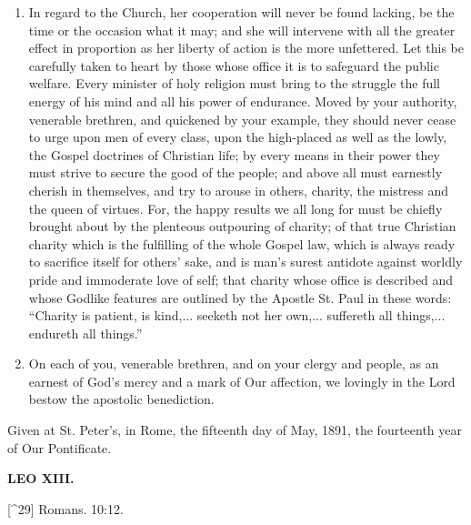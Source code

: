 \documentclass{book}
\begin{document}
\begin{enumerate}
	\item In regard to the Church, her cooperation will never be found lacking, be the time or the occasion what it may; and she will intervene with all the greater effect in proportion as her liberty of action is the more unfettered. Let this be carefully taken to heart by those whose office it is to safeguard the public welfare. Every minister of holy religion must bring to the struggle the full energy of his mind and all his power of endurance. Moved by your authority, venerable brethren, and quickened by your example, they should never cease to urge upon men of every class, upon the high-placed as well as the lowly, the Gospel doctrines of Christian life; by every means in their power they must strive to secure the good of the people; and above all must earnestly cherish in themselves, and try to arouse in others, charity, the mistress and the queen of virtues. For, the happy results we all long for must be chiefly brought about by the plenteous outpouring of charity; of that true Christian charity which is the fulfilling of the whole Gospel law, which is always ready to sacrifice itself for others’ sake, and is man’s surest antidote against worldly pride and immoderate love of self; that charity whose office is described and whose Godlike features are outlined by the Apostle St. Paul in these words: “Charity is patient, is kind,... seeketh not her own,... suffereth all things,... endureth all things.”\footnotemark[39]


	\item On each of you, venerable brethren, and on your clergy and people, as an earnest of God’s mercy and a mark of Our affection, we lovingly in the Lord bestow the apostolic benediction.



\end{enumerate}
Given at St. Peter’s, in Rome, the fifteenth day of May, 1891, the fourteenth year of Our Pontificate.

\textbf{LEO XIII.}

{[}\textasciicircum{}29{]} Romans. 10:12.
\end{document}
